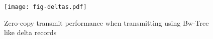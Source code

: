 \begin{figure}[t]
\texttt{[image: fig-deltas.pdf]}
\caption{Zero-copy transmit performance when transmitting using 
Bw-Tree like delta records}
\label{fig:deltas}
\end{figure}

